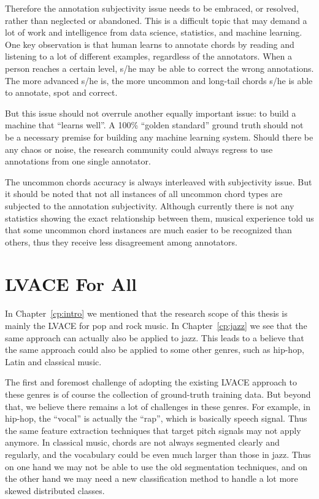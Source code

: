 Therefore the annotation subjectivity issue needs to be embraced, or resolved, rather than neglected or abandoned. This is a difficult topic that may demand a lot of work and intelligence from data science, statistics, and machine learning. One key observation is that human learns to annotate chords by reading and listening to a lot of different examples, regardless of the annotators. When a person reaches a certain level, s/he may be able to correct the wrong annotations. The more advanced s/he is, the more uncommon and long-tail chords s/he is able to annotate, spot and correct.

But this issue should not overrule another equally important issue: to build a machine that ``learns well''. A 100\% ``golden standard'' ground truth should not be a necessary premise for building any machine learning system. Should there be any chaos or noise, the research community could always regress to use annotations from one single annotator.

The uncommon chords accuracy is always interleaved with subjectivity issue. But it should be noted that not all instances of all uncommon chord types are subjected to the annotation subjectivity. Although currently there is not any statistics showing the exact relationship between them, musical experience told us that some uncommon chord instances are much easier to be recognized than others, thus they receive less disagreement among annotators.

\section{LVACE For All} \label{label:6-lvace4all}
In Chapter~\ref{cp:intro} we mentioned that the research scope of this thesis is mainly the LVACE for pop and rock music. In Chapter~\ref{cp:jazz} we see that the same approach can actually also be applied to jazz. This leads to a believe that the same approach could also be applied to some other genres, such as hip-hop, Latin and classical music.

The first and foremost challenge of adopting the existing LVACE approach to these genres is of course the collection of ground-truth training data. But beyond that, we believe there remains a lot of challenges in these genres. For example, in hip-hop, the ``vocal'' is actually the ``rap'', which is basically speech signal. Thus the same feature extraction techniques that target pitch signals may not apply anymore. In classical music, chords are not always segmented clearly and regularly, and the vocabulary could be even much larger than those in jazz. Thus on one hand we may not be able to use the old segmentation techniques, and on the other hand we may need a new classification method to handle a lot more skewed distributed classes.

